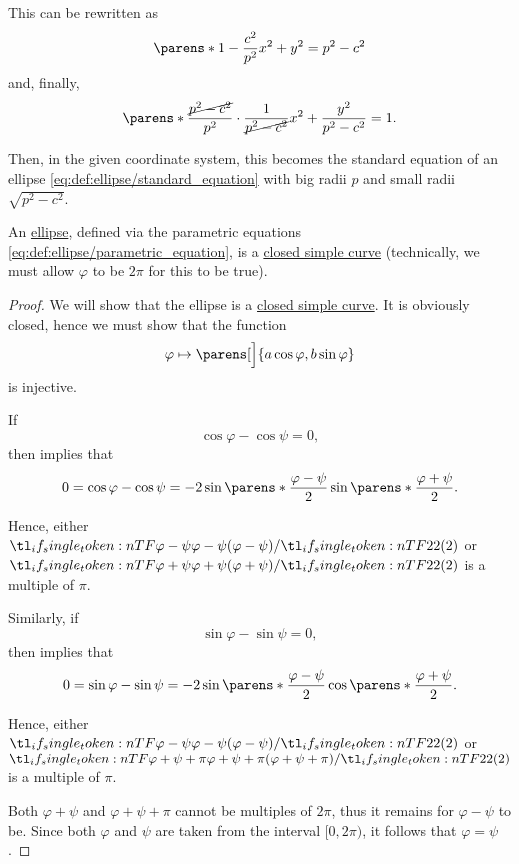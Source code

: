 \begin{defproof}
  This can be rewritten as
  \begin{equation*}
    \parens*{ 1 - \frac {c^2} {p^2} } x^2 + y^2 = p^2 - c^2
  \end{equation*}
  and, finally,
  \begin{equation*}
    \parens*{ \frac {\cancel{p^2 - c^2}} {p^2} \cdot \frac 1 {\cancel{p^2 - c^2}} } x^2 + \frac {y^2} {p^2 - c^2} = 1.
  \end{equation*}

  Then, in the given coordinate system, this becomes the standard equation of an ellipse \eqref{eq:def:ellipse/standard_equation} with big radii \( p \) and small radii \( \sqrt{p^2 - c^2} \).
\end{defproof}

\begin{proposition}\label{thm:ellipse_is_closed_simple_curve}
  An \hyperref[def:ellipse]{ellipse}, defined via the parametric equations \eqref{eq:def:ellipse/parametric_equation}, is a \hyperref[def:parametric_curve/simple]{closed simple curve} (technically, we must allow \( \varphi \) to be \( 2\pi \) for this to be true).
\end{proposition}
\begin{proof}
  We will show that the ellipse is a \hyperref[def:parametric_curve/simple]{closed simple curve}. It is obviously closed, hence we must show that the function
  \begin{equation*}
    \varphi \mapsto \parens[\Big]{ a \cos \varphi, b \sin \varphi }
  \end{equation*}
  is injective.

  If
  \begin{equation*}
    \cos \varphi - \cos \psi = 0,
  \end{equation*}
  then  implies that
  \begin{equation*}
    0
    =
    \cos \varphi - \cos \psi
    =
    -2 \sin\parens*{ \frac{\varphi - \psi} 2 } \sin\parens*{ \frac{\varphi + \psi} 2 }.
  \end{equation*}

  Hence, either \( \ifrac {\varphi - \psi} 2 \) or \( \ifrac {\varphi + \psi} 2 \) is a multiple of \( \pi \).

  Similarly, if
  \begin{equation*}
    \sin \varphi - \sin \psi = 0,
  \end{equation*}
  then  implies that
  \begin{equation*}
    0
    =
    \sin \varphi - \sin \psi
    =
    -2 \sin\parens*{ \frac{\varphi - \psi} 2 } \cos\parens*{ \frac{\varphi + \psi} 2 }.
  \end{equation*}

  Hence, either \( \ifrac {\varphi - \psi} 2 \) or \( \ifrac {\varphi + \psi + \pi} 2 \) is a multiple of \( \pi \).

  Both \( \varphi + \psi \) and \( \varphi + \psi + \pi \) cannot be multiples of \( 2\pi \),  thus it remains for \( \varphi - \psi \) to be. Since both \( \varphi \) and \( \psi \) are taken from the interval \( [0, 2\pi) \), it follows that \( \varphi = \psi \).
\end{proof}


